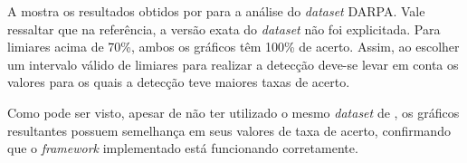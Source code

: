 A  mostra os resultados obtidos por \cite{HOQUE201748} para a análise do \textit{dataset} DARPA. Vale ressaltar que na referência, a versão exata do \textit{dataset} não foi explicitada.  Para limiares acima de 70\%, ambos os gráficos têm 100\% de acerto. Assim, ao escolher um intervalo válido de limiares para realizar a detecção deve-se levar em conta os valores para os quais a detecção teve maiores taxas de acerto.

Como pode ser visto, apesar de não ter utilizado o mesmo \textit{dataset} de \cite{HOQUE201748},  os gráficos resultantes possuem semelhança em seus valores de taxa de acerto, confirmando que o \textit{framework} implementado está funcionando corretamente.  
